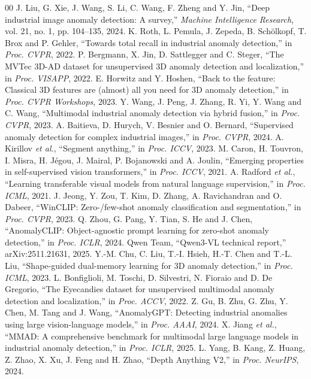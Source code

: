 \documentclass[conference]{IEEEtran}
\begin{document}
\begin{thebibliography}{00}
 J. Liu, G. Xie, J. Wang, S. Li, C. Wang, F. Zheng and Y. Jin, ``Deep industrial image anomaly detection: A survey,'' \emph{Machine Intelligence Research}, vol. 21, no. 1, pp. 104--135, 2024.
 K. Roth, L. Pemula, J. Zepeda, B. Sch\"olkopf, T. Brox and P. Gehler, ``Towards total recall in industrial anomaly detection,'' in \emph{Proc. CVPR}, 2022.
 P. Bergmann, X. Jin, D. Sattlegger and C. Steger, ``The MVTec 3D-AD dataset for unsupervised 3D anomaly detection and localization,'' in \emph{Proc. VISAPP}, 2022.
 E. Horwitz and Y. Hoshen, ``Back to the feature: Classical 3D features are (almost) all you need for 3D anomaly detection,'' in \emph{Proc. CVPR Workshops}, 2023.
 Y. Wang, J. Peng, J. Zhang, R. Yi, Y. Wang and C. Wang, ``Multimodal industrial anomaly detection via hybrid fusion,'' in \emph{Proc. CVPR}, 2023.
 A. Baitieva, D. Hurych, V. Besnier and O. Bernard, ``Supervised anomaly detection for complex industrial images,'' in \emph{Proc. CVPR}, 2024.
 A. Kirillov \emph{et al.}, ``Segment anything,'' in \emph{Proc. ICCV}, 2023.
 M. Caron, H. Touvron, I. Misra, H. J\'egou, J. Mairal, P. Bojanowski and A. Joulin, ``Emerging properties in self-supervised vision transformers,'' in \emph{Proc. ICCV}, 2021.
 A. Radford \emph{et al.}, ``Learning transferable visual models from natural language supervision,'' in \emph{Proc. ICML}, 2021.
 J. Jeong, Y. Zou, T. Kim, D. Zhang, A. Ravichandran and O. Dabeer, ``WinCLIP: Zero-/few-shot anomaly classification and segmentation,'' in \emph{Proc. CVPR}, 2023.
 Q. Zhou, G. Pang, Y. Tian, S. He and J. Chen, ``AnomalyCLIP: Object-agnostic prompt learning for zero-shot anomaly detection,'' in \emph{Proc. ICLR}, 2024.
 Qwen Team, ``Qwen3-VL technical report,'' arXiv:2511.21631, 2025.
 Y.-M. Chu, C. Liu, T.-I. Hsieh, H.-T. Chen and T.-L. Liu, ``Shape-guided dual-memory learning for 3D anomaly detection,'' in \emph{Proc. ICML}, 2023.
 L. Bonfiglioli, M. Toschi, D. Silvestri, N. Fioraio and D. De Gregorio, ``The Eyecandies dataset for unsupervised multimodal anomaly detection and localization,'' in \emph{Proc. ACCV}, 2022.
 Z. Gu, B. Zhu, G. Zhu, Y. Chen, M. Tang and J. Wang, ``AnomalyGPT: Detecting industrial anomalies using large vision-language models,'' in \emph{Proc. AAAI}, 2024.
 X. Jiang \emph{et al.}, ``MMAD: A comprehensive benchmark for multimodal large language models in industrial anomaly detection,'' in \emph{Proc. ICLR}, 2025.
 L. Yang, B. Kang, Z. Huang, Z. Zhao, X. Xu, J. Feng and H. Zhao, ``Depth Anything V2,'' in \emph{Proc. NeurIPS}, 2024.
\end{thebibliography}
\end{document}
